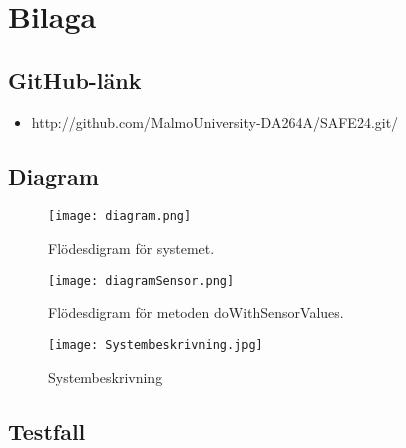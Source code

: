 
\chapter{Bilaga} %
\label{bilaga}

\ifpdf
    \graphicspath{{10_bilaga/figures/PNG/}{10/figures/PDF/}{10/figures/}}
\else
    \graphicspath{{10_bilaga/figures/EPS/}{10/figures/}}
\fi

\graphicspath{{10_bilaga/figures/}{10/figures/}}



\section{GitHub-länk}

\begin{itemize}
\item http://github.com/MalmoUniversity-DA264A/SAFE24.git/
\end{itemize}


\section{Diagram}

\begin{figure}[h]
  \texttt{[image: diagram.png]}
  \caption{Flödesdigram för systemet.}
  \label{fig:diagram}
\end{figure}

\begin{figure}[h]
  \texttt{[image: diagramSensor.png]}
  \caption{Flödesdigram för metoden doWithSensorValues.}
  \label{fig:diagramSensor}
\end{figure}

\begin{figure}[h]
  \texttt{[image: Systembeskrivning.jpg]}
  \caption{Systembeskrivning}
  \label{fig:Systembeskrivning}
\end{figure}

\clearpage

\section{Testfall}

